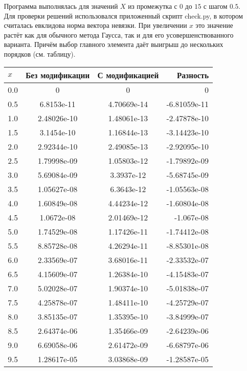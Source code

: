 Программа выполнялась для значений $X$ из промежутка с $0$ до $15$ с шагом $0.5$.
Для проверки решений использовался приложенный скрипт check.py, в котором считалась евклидова норма вектора невязки.
При увеличении $x$ это значение растёт как для обычного метода Гаусса, так и для его усовершенствованного варианта.
Причём выбор главного элемента даёт выигрыш до нескольких порядков (см. таблицу).
\newpage
\begin{tabular}{|l|c|c|r|}
    \hline
        $x$ & Без модификации & С модификацией & Разность \\ \hline
        0.0 &   0 & 0 & 0 \\ \hline
        0.5 &   6.8153e-11  & 4.70669e-14 & -6.81059e-11 \\ \hline
        1.0 &   2.48026e-10 & 1.48061e-13 & -2.47878e-10 \\ \hline
        1.5 &   3.1454e-10  & 1.16844e-13 & -3.14423e-10 \\ \hline
        2.0 &   2.92344e-10 & 2.49085e-13 & -2.92095e-10 \\ \hline
        2.5 &   1.79998e-09 & 1.05803e-12 & -1.79892e-09 \\ \hline
        3.0 &   5.69084e-09 & 3.3937e-12  & -5.68745e-09 \\ \hline
        3.5 &   1.05627e-08 & 6.3643e-12  & -1.05563e-08 \\ \hline
        4.0 &   1.60849e-08 & 4.44234e-12 & -1.60804e-08 \\ \hline
        4.5 &   1.0672e-08  & 2.01469e-12 & -1.067e-08 \\ \hline
        5.0 &   1.74529e-08 & 1.17426e-11 & -1.74412e-08 \\ \hline
        5.5 &   8.85728e-08 & 4.26294e-11 & -8.85301e-08 \\ \hline
        6.0 &   2.33569e-07 & 3.68016e-11 & -2.33532e-07 \\ \hline
        6.5 &   4.15609e-07 & 1.26384e-10 & -4.15483e-07 \\ \hline
        7.0 &   5.02028e-07 & 1.90374e-10 & -5.01838e-07 \\ \hline
        7.5 &   4.25878e-07 & 1.48411e-10 & -4.25729e-07 \\ \hline
        8.0 &   3.85135e-07 & 1.35395e-10 & -3.84999e-07 \\ \hline
        8.5 &   2.64374e-06 & 1.35466e-09 & -2.64239e-06 \\ \hline
        9.0 &   6.69058e-06 & 2.61472e-09 & -6.68797e-06 \\ \hline
        9.5 &   1.28617e-05 & 3.03868e-09 & -1.28587e-05 \\ \hline

\end{tabular}
